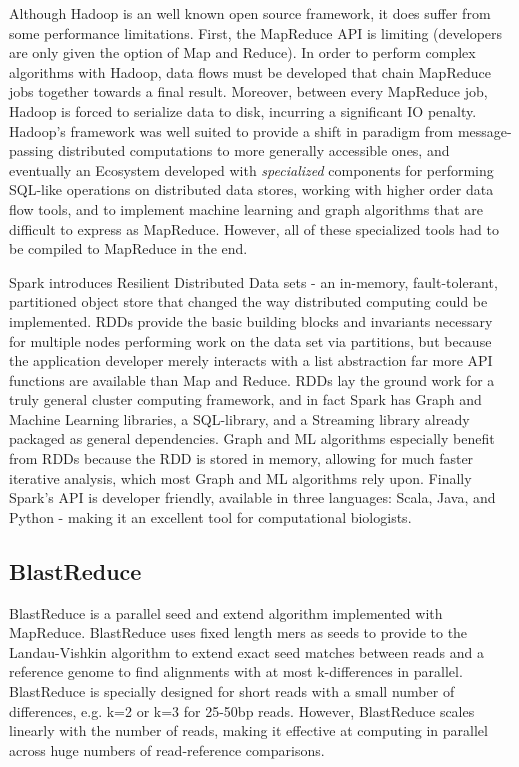 \documentclass[conference,letterpaper,11pt]{IEEEtran}
\begin{document}
   	Although Hadoop is an well known open source framework, it does suffer from some performance limitations. First, the MapReduce API is limiting (developers are only given the option of Map and Reduce). In order to perform complex algorithms with Hadoop, data flows must be developed that chain MapReduce jobs together towards a final result. Moreover, between every MapReduce job, Hadoop is forced to serialize data to disk, incurring a significant IO penalty. Hadoop's framework was well suited to provide a shift in paradigm from message-passing distributed computations to more generally accessible ones, and eventually an Ecosystem developed with \textit{specialized} components for performing SQL-like operations on distributed data stores, working with higher order data flow tools, and to implement machine learning and graph algorithms that are difficult to express as MapReduce. However, all of these specialized tools had to be compiled to MapReduce in the end. 
    
    Spark introduces Resilient Distributed Data sets \cite{zaharia_resilient_2012} - an in-memory, fault-tolerant, partitioned object store that changed the way distributed computing could be implemented. RDDs provide the basic building blocks and invariants necessary for multiple nodes performing work on the data set via partitions, but because the application developer merely interacts with a list abstraction far more API functions are available than Map and Reduce. RDDs lay the ground work for a truly general cluster computing framework, and in fact Spark has Graph and Machine Learning libraries, a SQL-library, and a Streaming library already packaged as general dependencies. Graph and ML algorithms especially benefit from RDDs because the RDD is stored in memory, allowing for much faster iterative analysis, which most Graph and ML algorithms rely upon. Finally  Spark's API is developer friendly, available in three languages: Scala, Java, and Python - making it an excellent tool for computational biologists. 

\subsection{BlastReduce}

	BlastReduce is a parallel seed and extend algorithm implemented with MapReduce. BlastReduce uses fixed length mers as seeds to provide to the Landau-Vishkin \cite{landau_introducing_1986} algorithm to extend exact seed matches between reads and a reference genome to find alignments with at most k-differences in parallel. BlastReduce is specially designed for short reads with a small number of differences, e.g. k=2 or k=3 for 25-50bp reads. However, BlastReduce scales linearly with the number of reads, making it effective at computing in parallel across huge numbers of read-reference comparisons. 
    
\end{document}
